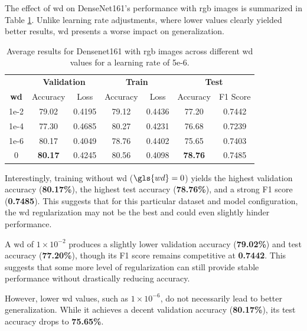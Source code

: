 The effect of \gls{wd} on DenseNet161's performance with \gls{rgb} images is summarized 
in Table \ref{tab:densenet161_wd_rgb}. Unlike learning rate adjustments, where lower 
values clearly yielded better results, \gls{wd} presents a worse impact 
on generalization.

\begin{table}[h]
    \centering
    \renewcommand{\arraystretch}{1.3}
    \setlength{\tabcolsep}{8pt}
    \begin{tabular}{|c|cccccc|}
        \hline
        & \multicolumn{2}{c}{\textbf{Validation}} & \multicolumn{2}{c}{\textbf{Train}} & \multicolumn{2}{c|}{\textbf{Test}} \\
        \textbf{\gls{wd}} & Accuracy & Loss & Accuracy & Loss & Accuracy & F1 Score \\
        \hline
        1e-2     & 79.02   & 0.4195 & 79.12 & 0.4436  & 77.20  & 0.7442 \\
        1e-4   & 77.30     & 0.4685 & 80.27 & 0.4231  & 76.68  & 0.7239 \\
        1e-6 & 80.17       & 0.4049 & 78.76 & 0.4402  & 75.65  & 0.7403 \\
        0 & \textbf{80.17} & 0.4245 & 80.56 & 0.4098 & \textbf{78.76} & 0.7485 \\
        \hline
    \end{tabular}
    \caption{Average results for Densenet161 with \gls{rgb} images across different \gls{wd} values for a learning rate of 5e-6.}
    \label{tab:densenet161_wd_rgb}
\end{table}

Interestingly, training without \gls{wd} ($\gls{wd}=0$) yields the highest validation 
accuracy (\textbf{80.17\%}), the highest test accuracy (\textbf{78.76\%}), and 
a strong F1 score (\textbf{0.7485}). This suggests that for this particular dataset 
and model configuration, the \gls{wd} regularization may not be the best and could even 
slightly hinder performance.

A \gls{wd} of $1\times10^{-2}$ produces a slightly lower validation accuracy (\textbf{79.02\%}) 
and test accuracy (\textbf{77.20\%}), though its F1 score remains competitive at 
\textbf{0.7442}. This suggests that some more level of regularization can still 
provide stable performance without drastically reducing accuracy.

However, lower \gls{wd} values, such as $1\times10^{-6}$, do not necessarily 
lead to better generalization. While it achieves a decent validation accuracy 
(\textbf{80.17\%}), its test accuracy drops to \textbf{75.65\%}.


